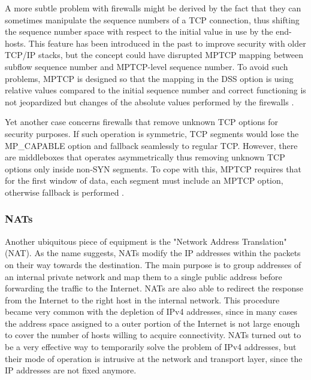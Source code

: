 A more subtle problem with firewalls might be derived by the fact that they can sometimes manipulate the sequence numbers of a TCP connection, thus shifting the sequence number space with respect to the initial value in use by the end-hosts. This feature has been introduced in the past to improve security with older TCP/IP stacks, but the concept could have disrupted MPTCP mapping between subflow sequence number and MPTCP-level sequence number. To avoid such problems, MPTCP is designed so that the mapping in the DSS option is using relative values compared to the initial sequence number and correct functioning is not jeopardized but changes of the absolute values performed by the firewalls \cite{2014:2578508}.

Yet another case concerns firewalls that remove unknown TCP options for security purposes. If such operation is symmetric, TCP segments would lose the MP\_CAPABLE option and fallback seamlessly to regular TCP. However, there are middleboxes that operates asymmetrically thus removing unknown TCP options only inside non-SYN segments. To cope with this, MPTCP requires that for the first window of data, each segment must include an MPTCP option, otherwise fallback is performed \cite{HDPDB13}.

\subsubsection{NATs}
Another ubiquitous piece of equipment is the "Network Address Translation" (NAT). As the name suggests, NATs modify the IP addresses within the packets on their way towards the destination. The main purpose is to group addresses of an internal private network and map them to a single public address before forwarding the traffic to the Internet. NATs are also able to redirect the response from the Internet to the right host in the internal network.
This procedure became very common with the depletion of IPv4 addresses, since in many cases the address space assigned to a outer portion of the Internet is not large enough to cover the number of hosts willing to acquire connectivity. 
NATs turned out to be a very effective way to temporarily solve the problem of IPv4 addresses, but their mode of operation is intrusive at the network and transport layer, since the IP addresses are not fixed anymore.

